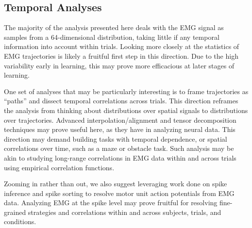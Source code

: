 \documentclass[../main.tex]{subfiles}
\begin{document}
\subsection{Temporal Analyses}

The majority of the analysis presented here deals with the EMG signal as samples from a 64-dimensional distribution, taking little if any temporal information into account within trials. Looking more closely at the statistics of EMG trajectories is likely a fruitful first step in this direction. Due to the high variability early in learning, this may prove more efficacious at later stages of learning.

One set of analyses that may be particularly interesting is to frame trajectories as ``paths'' and dissect temporal correlations across trials. This direction reframes the analysis from thinking about distributions over spatial signals to distributions over trajectories\cite{mcnameeHierarchicalModelbasedPolicy2020b,mcnameeCharacterizingOptimalHierarchical2017a}. Advanced interpolation/alignment and tensor decomposition techniques may prove useful here, as they have in analyzing neural data\cite{onkenUsingMatrixTensor2016}. This direction may demand building tasks with temporal dependence, or spatial correlations over time, such as a maze or obstacle task. Such analysis may be akin to studying long-range correlations in EMG data within and across trials using empirical correlation functions\cite{crevecoeurGoldstandardApproachAddress2010}.

Zooming in rather than out, we also suggest leveraging work done on spike inference and spike sorting to resolve motor unit action potentials from EMG data\cite{pachitariuSpikeSortingKilosort42024}. Analyzing EMG at the spike level may prove fruitful for resolving fine-grained strategies and correlations within and across subjects, trials, and conditions\cite{digeUnsupervisedBayesianDecomposition2010,mendezguerraNoninvasiveRealtimeAccess2021}.



\end{document}
